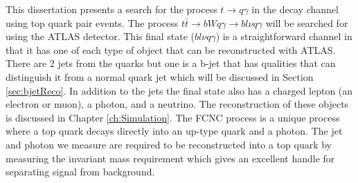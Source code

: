This dissertation presents a search for the process $t\rightarrow q \gamma$ in the decay channel using top quark pair events.  The process $t\bar{t} \rightarrow bWq\gamma \rightarrow bl\nu q\gamma$ will be searched for using the ATLAS detector.  This final state ($b l \nu q \gamma$) is a straightforward channel in that it has one of each type of object that can be reconstructed with ATLAS.  There are 2 jets from the quarks but one is a b-jet that has qualities that can distinguish it from a normal quark jet which will be discussed in Section \ref{sec:bjetReco}.  In addition to the jets the final state also has a charged lepton (an electron or muon), a photon, and a neutrino.  The reconstruction of these objects is discussed in Chapter \ref{ch:Simulation}.  The FCNC process is a unique process where a top quark decays directly into an up-type quark and a photon.  The jet and photon we measure are required to be reconstructed into a top quark by measuring the invariant mass requirement which gives an excellent handle for separating signal from background.






%

%


